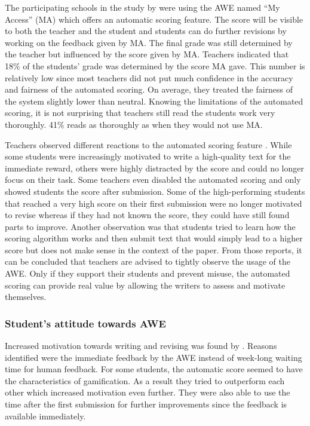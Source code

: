 \documentclass[runningheads]{llncs}
\begin{document}
The participating schools in the study by \textcite{grimes_utility_2010} were using the AWE named ``My Access'' (MA) which offers an automatic scoring feature. The score will be visible to both the teacher and the student and students can do further revisions by working on the feedback given by MA. The final grade was still determined by the teacher but influenced by the score given by MA. Teachers indicated that 18\% of the students' grade was determined by the score MA gave. This number is relatively low since most teachers did not put much confidence in the accuracy and fairness of the automated scoring. On average, they treated the fairness of the system slightly lower than neutral. Knowing the limitations of the automated scoring, it is not surprising that teachers still read the students work very thoroughly. 41\% reads as thoroughly as when they would not use MA. 

Teachers observed different reactions to the automated scoring feature \citep{grimes_utility_2010}. While some students were increasingly motivated to write a high-quality text for the immediate reward, others were highly distracted by the score and could no longer focus on their task. Some teachers even disabled the automated scoring and only showed students the score after submission. Some of the high-performing students that reached a very high score on their first submission were no longer motivated to revise whereas if they had not known the score, they could have still found parts to improve. Another observation was that students tried to learn how the scoring algorithm works and then submit text that would simply lead to a higher score but does not make sense in the context of the paper. From those reports, it can be concluded that teachers are advised to tightly observe the usage of the AWE. Only if they support their students and prevent misuse, the automated scoring can provide real value by allowing the writers to assess and motivate themselves.

\subsubsection{Student's attitude towards AWE}
Increased motivation towards writing and revising was found by \textcite{grimes_utility_2010}. Reasons identified were the immediate feedback by the AWE instead of week-long waiting time for human feedback. For some students, the automatic score seemed to have the characteristics of gamification. As a result they tried to outperform each other which increased motivation even further. They were also able to use the time after the first submission for further improvements since the feedback is available immediately.
\end{document}
